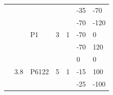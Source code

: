 \begin{table}[]
\begin{tabular}{@{}lllllll@{}}
                                &                                                                                &                                                                           &                                                              &                                                             & -35      & -70    \\
                                &                                                                                & \multirow{3}{*}{P1}                                                       & \multirow{3}{*}{3}                                           & \multirow{3}{*}{1}                                          & -70      & -120   \\
                                &                                                                                &                                                                           &                                                              &                                                             & -70      & 0      \\
                                &                                                                                &                                                                           &                                                              &                                                             & -70      & 120    \\ \cmidrule(l){2-7} 
                                & \multirow{8}{*}{3.8}                                                           & \multirow{5}{*}{P6122}                                                    & \multirow{5}{*}{5}                                           & \multirow{5}{*}{1}                                          & 0        & 0      \\
                                &                                                                                &                                                                           &                                                              &                                                             & -15      & 100    \\
                                &                                                                                &                                                                           &                                                              &                                                             & -25      & -100   \\

\end{tabular}
\end{table}
